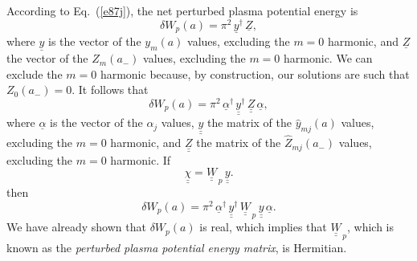 \documentclass[12pt,prb,aps]{revtex4-1}
\begin{document}
According to Eq.~(\ref{e87j}), the net perturbed plasma potential energy is
\begin{equation}
\delta W_p(a) = \pi^2\,\underline{y}^{\dag}\,\underline{Z},
\end{equation}
where $\underline{y}$ is the vector of the $y_m(a)$ values, excluding the $m=0$ harmonic,  and $\underline{Z}$  the vector of the $Z_m(a_-)$ values,
excluding the $m=0$ harmonic.  We can exclude the $m=0$ harmonic because, by construction, our solutions are such that $Z_0(a_-)=0$. It follows that
\begin{equation}
\delta W_p(a) = \pi^2\,\underline{\alpha}^\dag \,\underline{\underline{y}}^\dag \,\underline{\underline{Z}}\,\underline{\alpha},
\end{equation}
where $\underline{\alpha}$ is the vector of the $\alpha_j$ values, $\underline{\underline{y}}$ the matrix of the $\hat{y}_{mj}(a)$ values, excluding the $m=0$ harmonic, 
and $\underline{\underline{Z}}$ the matrix of the $\hat{Z}_{mj}(a_-)$ values, excluding the $m=0$ harmonic. 
If
\begin{equation}
\underline{\underline{\chi}} = \underline{\underline{W}}_{\,p}\,\underline{\underline{y}}.
\end{equation}
then 
\begin{equation}
\delta W_p(a) = \pi^2\,\underline{\alpha}^\dag \,\underline{\underline{y}}^\dag \,\underline{\underline{W}}_{\,p}\,\underline{\underline{y}}\,\underline{\alpha}.
\end{equation}
We have already shown that $\delta W_p(a)$ is real, which implies that $\underline{\underline{W}}_{\,p}$, which is known as the {\em perturbed plasma potential energy matrix},
is Hermitian. 
\end{document}

